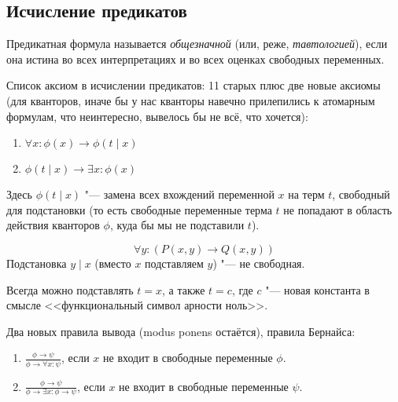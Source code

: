 \subsection{Исчисление предикатов}
\begin{Def}
	Предикатная формула называется \textsl{общезначной} (или, реже, \textsl{тавтологией}),
	если она истина во всех интерпретациях и во всех оценках свободных переменных.
\end{Def}
Список аксиом в исчислении предикатов: 11 старых плюс две новые аксиомы
(для кванторов, иначе бы у нас кванторы навечно прилепились к атомарным формулам, что неинтересно,
вывелось бы не всё, что хочется):
\begin{enumerate}
	\item $\forall x \colon \phi(x) \to \phi(t \mid x)$
	\item $\phi(t \mid x) \to \exists x \colon \phi(x)$
\end{enumerate}
Здесь $\phi(t \mid x)$ "--- замена всех вхождений переменной $x$ на терм $t$, свободный для
подстановки (то есть свободные переменные терма $t$ не попадают в область действия кванторов $\phi$,
куда бы мы не подставили $t$).
\begin{exmp}
	\[ \forall y \colon (P(x, y) \to Q(x, y)) \]
	Подстановка $y \mid x$ (вместо $x$ подставляем $y$) "--- не свободная.
\end{exmp}
\begin{exmp}
	Всегда можно подставлять $t=x$, а также $t=c$, где $c$ "--- новая константа в смысле <<функциональный символ арности ноль>>.
\end{exmp}
Два новых правила вывода (modus ponens остаётся), правила Бернайса:
\begin{enumerate}
	\item $\frac{\phi \to \psi}{\phi \to \forall x \colon \psi}$, если $x$ не входит в свободные переменные $\phi$.
	\item $\frac{\phi \to \psi}{\phi \to \exists x \colon \phi \to \psi}$, если $x$ не входит в свободные переменные $\psi$.
\end{enumerate}


